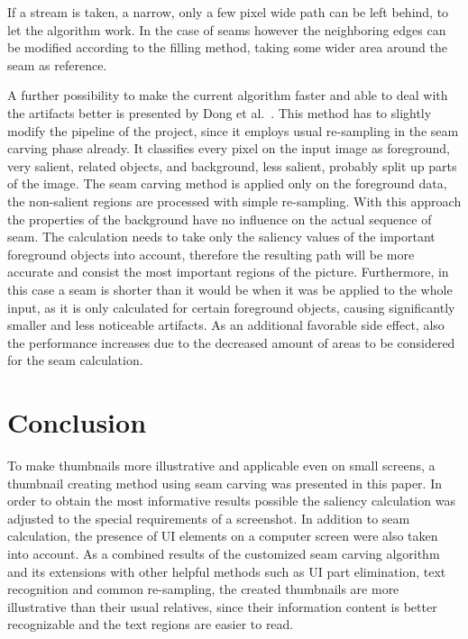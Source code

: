 \documentclass[draft,final]{vutinfth} %
\begin{document}
	If a stream is taken, a narrow, only a few pixel wide path can be left behind, to let the algorithm work.
	In the case of seams however the neighboring edges can be modified according to the filling method, taking some wider area around the seam as reference.\par 
	A further possibility to make the current algorithm faster and able to deal with the artifacts better is presented by Dong et al.~\cite{dong2009optimized}.
	This method has to slightly modify the pipeline of the project, since it employs usual re-sampling in the seam carving phase already.
	It classifies every pixel on the input image as foreground, very salient, related objects, and background, less salient, probably split up parts of the image.
	The seam carving method is applied only on the foreground data, the non-salient regions are processed with simple re-sampling. 
	With this approach the properties of the background have no influence on the actual sequence of seam.
	The calculation needs to take only the saliency values of the important foreground objects into account, therefore the resulting path will be more accurate and consist the most important regions of the picture.
	Furthermore, in this case a seam is shorter than it would be when it was be applied to the whole input, as it is only calculated for certain foreground objects, causing significantly smaller and less noticeable artifacts.
	As an additional favorable side effect, also the performance increases due to the decreased amount of areas to be considered for the seam calculation.    
	
	\chapter{Conclusion}
	To make thumbnails more illustrative and applicable even on small screens, a thumbnail creating method using seam carving was presented in this paper.
	In order to obtain the most informative results possible the saliency calculation was adjusted to the special requirements of a screenshot.
	In addition to seam calculation, the presence of UI elements on a computer screen were also taken into account.
	As a combined results of the customized seam carving algorithm and its extensions with other helpful methods such as UI part elimination, text recognition and common re-sampling, the created thumbnails are more illustrative than their usual relatives, since their information content is better recognizable and the text regions are easier to read. 
	
\end{document}

